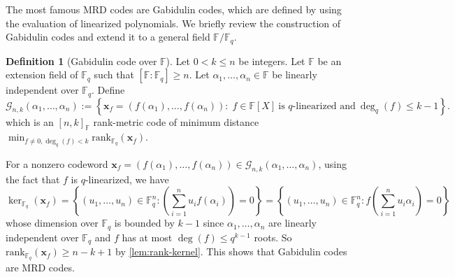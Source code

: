 \documentclass[11pt]{article}
\newif\ifmynotes
\newcommand{\ZGnote}[1]{\ifmynotes\textcolor{purple}{[Zeyu: #1]}\else\fi}
\theoremstyle{plain}
\newtheorem{prop}[thm]{Proposition}
\theoremstyle{definition}
\newtheorem{defn}[thm]{Definition}
\theoremstyle{remark}
\newcommand{\F}{\mathbb{F}}
\newcommand{\bx}{\bm{x}}
\newcommand{\rank}{\mathrm{rank}}
\def \mG {\mathcal{G}}
\begin{document}
The most famous MRD codes are Gabidulin codes, which are defined by using the evaluation of linearized polynomials. We briefly review the construction of Gabidulin codes \cite{G85} and extend it to a general field $\F/\F_q$.
\begin{defn}[Gabidulin code over $\F$]
Let $0<k\leq n$ be integers.
Let $\F$ be an extension field of $\F_q$ such that $[\F:\F_q]\geq n$.
Let $\alpha_1,\dotsc, \alpha_n\in\F$ be linearly independent over $\F_q$. Define
\[
\mG_{n,k}(\alpha_1,\dotsc, \alpha_n) := \left\{\bx_f=(f(\alpha_1),\ldots,f(\alpha_n)):\; f\in\F[X]~\text{is $q$-linearized and}~\deg_q(f)\leq k-1\right\}.
\]
which is an $[n,k]_\F$ rank-metric code of minimum distance $\min_{f\neq 0,\deg_q(f)<k}\rank_{\F_q}(\bx_f)$.
\end{defn}

For a nonzero codeword $\bx_f=(f(\alpha_1),\ldots,f(\alpha_n))\in \mG_{n,k}(\alpha_1,\dotsc, \alpha_n)$, using the fact that $f$ is $q$-linearized, we have 
\[
\ker_{\F_q}(\bx_f)
=\left\{(u_1,\dots,u_n)\in\F_q^n: \left(\sum_{i=1}^n u_i f(\alpha_i)\right)=0\right\}
=\left\{(u_1,\dots,u_n)\in\F_q^n: f\left(\sum_{i=1}^n u_i \alpha_i\right)=0\right\}
\]
whose dimension over $\F_q$ is bounded by $k-1$ since $\alpha_1,\dots,\alpha_n$ are linearly independent over $\F_q$ and $f$ has at most $\deg(f)\leq q^{k-1}$ roots. So $\rank_{\F_q}(\bx_f)\geq n-k+1$ by \cref{lem:rank-kernel}. This shows that Gabidulin codes are MRD codes.

\end{document}
